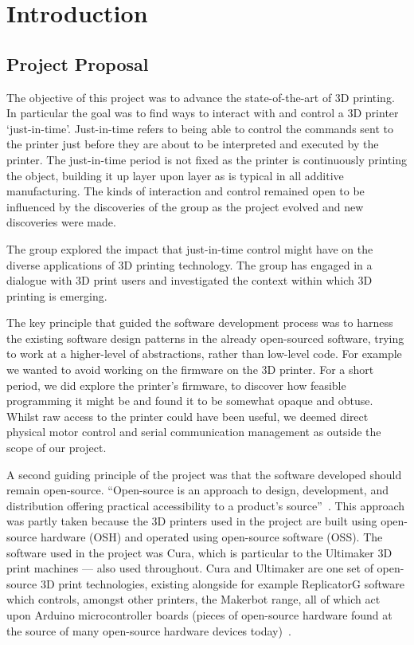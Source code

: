 \documentclass[pdftex, 11pt]{report} %
\begin{document}
\tableofcontents


\chapter{Introduction}
\section{Project Proposal}
The objective of this project was to advance the state-of-the-art of 3D printing. In particular the goal was to find ways to interact with and control a 3D printer `just-in-time'. Just-in-time refers to being able to control the commands sent to the printer just before they are about to be interpreted and executed by the printer. The just-in-time period is not fixed as the printer is continuously printing the object, building it up layer upon layer as is typical in all additive manufacturing. The kinds of interaction and control remained open to be influenced by the discoveries of the group as the project evolved and new discoveries were made.

The group explored the impact that just-in-time control might have on the diverse applications of 3D printing technology. The group has engaged in a dialogue with 3D print users and investigated the context within which 3D printing is emerging. 

The key principle that guided the software development process was to harness the existing software design patterns in the already open-sourced software, trying to work at a higher-level of abstractions, rather than low-level code. For example we wanted to avoid working on the firmware on the 3D printer. For a short period, we did explore the printer's firmware, to discover how feasible programming it might be and found it to be somewhat opaque and obtuse. Whilst raw access to the printer could have been useful, we deemed direct physical motor control and serial communication management as outside the scope of our project.

A second guiding principle of the project was that the software developed should remain open-source. ``Open-source is an approach to design, development, and distribution offering practical accessibility to a product's source''~\cite{Zennaro2013}. This approach was partly taken because the 3D printers used in the project are built using open-source hardware (OSH) and operated using open-source software (OSS). The software used in the project was Cura, which is particular to the Ultimaker 3D print machines --- also used throughout. Cura and Ultimaker are one set of open-source 3D print technologies, existing alongside for example ReplicatorG software which controls, amongst other printers, the Makerbot range, all of which act upon Arduino microcontroller boards (pieces of open-source hardware found at the source of many open-source hardware devices today)~\cite{Zennaro2013}.
\end{document}
